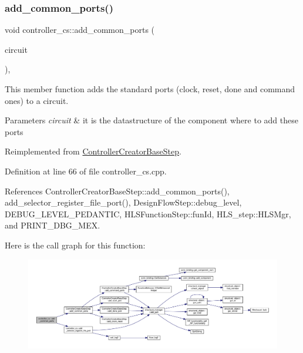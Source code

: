 \subsubsection{\texorpdfstring{add\+\_\+common\+\_\+ports()}{add\_common\_ports()}}
{\footnotesize\ttfamily void controller\+\_\+cs\+::add\+\_\+common\+\_\+ports (\begin{DoxyParamCaption}\item[{\hyperlink{structural__objects_8hpp_a8ea5f8cc50ab8f4c31e2751074ff60b2}{structural\+\_\+object\+Ref}}]{circuit }\end{DoxyParamCaption})\hspace{0.3cm}{\ttfamily [protected]}, {\ttfamily [virtual]}}



This member function adds the standard ports (clock, reset, done and command ones) to a circuit. 


\begin{DoxyParams}{Parameters}
{\em circuit} & it is the datastructure of the component where to add these ports \\
\hline
\end{DoxyParams}


Reimplemented from \hyperlink{classControllerCreatorBaseStep_aae1b2e6c9d6c8f5b4e3a7b6a26d1d56a}{Controller\+Creator\+Base\+Step}.



Definition at line 66 of file controller\+\_\+cs.\+cpp.



References Controller\+Creator\+Base\+Step\+::add\+\_\+common\+\_\+ports(), add\+\_\+selector\+\_\+register\+\_\+file\+\_\+port(), Design\+Flow\+Step\+::debug\+\_\+level, D\+E\+B\+U\+G\+\_\+\+L\+E\+V\+E\+L\+\_\+\+P\+E\+D\+A\+N\+T\+IC, H\+L\+S\+Function\+Step\+::fun\+Id, H\+L\+S\+\_\+step\+::\+H\+L\+S\+Mgr, and P\+R\+I\+N\+T\+\_\+\+D\+B\+G\+\_\+\+M\+EX.

Here is the call graph for this function\+:
\nopagebreak
\begin{figure}[H]
\begin{center}
\leavevmode
\includegraphics[width=350pt]{d9/dfb/classcontroller__cs_a8e36030a52dc30ae10633fc28a45a2bb_cgraph}
\end{center}
\end{figure}
\mbox{\label{classcontroller__cs_a4edfec7623dd2b6abd2be4a994fb19e2}} 
